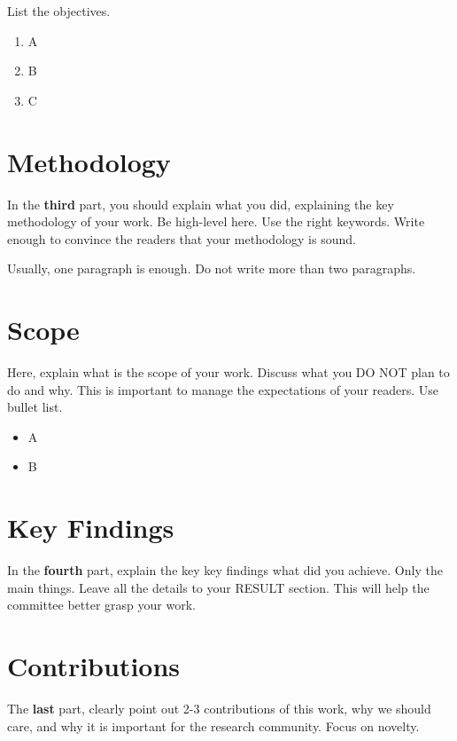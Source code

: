 List the objectives.
\begin{enumerate}
    \item A
    \item B
    \item C
\end{enumerate}

\section{Methodology}
In the \textbf{third} part, you should explain what you did, explaining the key methodology of your work.   Be high-level here.  Use the right keywords.  Write enough to convince the readers that your methodology is sound.

Usually, one paragraph is enough. Do not write more than two paragraphs.

\section{Scope}
Here,  explain what is the scope of your work.  Discuss what you DO NOT plan to do and why.  This is important to manage the expectations of your readers.   Use bullet list.
\begin{itemize}
    \item A
    \item B
\end{itemize}

\section{Key Findings}
In the \textbf{fourth} part, explain the key key findings what did you achieve.  Only the main things.   Leave all the details to your RESULT section.   This will help the committee better grasp your work.

\section{Contributions}
The \textbf{last} part, clearly point out 2-3 contributions of this work, why we should care, and why it is important for the research community.  Focus on novelty.
